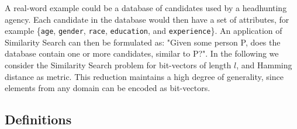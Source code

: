 \documentclass[a4paper,11pt]{article}
\begin{document}
A real-word example could be a database of candidates used by a headhunting agency. Each candidate in the database would then have a set of attributes, for example \{\texttt{age}, \texttt{gender}, \texttt{race}, \texttt{education}, and \texttt{experience}\}.
An application of Similarity Search can then be formulated as: "Given some person P, does the database contain one or more candidates, similar to P?".
In the following we consider the Similarity Search problem for bit-vectors of length $l$, and Hamming distance as metric. This reduction maintains a high degree of generality, since elements from any domain can be encoded as bit-vectors.

\subsection{Definitions}
\end{document}
